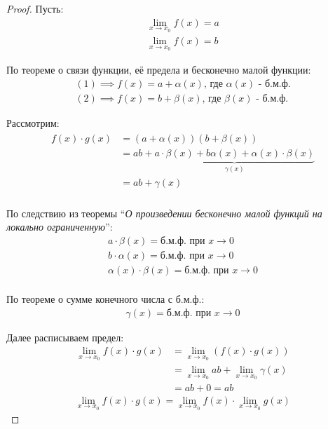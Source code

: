 \begin{proof}
    Пусть:
    \begin{gather*}
        \lim_{x \to x_0} f(x) = a \tag{1} \\
        \lim_{x \to x_0} f(x) = b \tag{2}
    \end{gather*}

    По теореме о связи функции, её предела и бесконечно малой функции:
    \begin{gather*}
        (1) \implies f(x) = a + \alpha(x) \text{, где } \alpha(x) \text{ - б.м.ф.} \\
        (2) \implies f(x) = b + \beta(x) \text{, где } \beta(x) \text{ - б.м.ф.}
    \end{gather*}

    Рассмотрим:
    \begin{gather*}
        \begin{align*}
        f(x) \cdot g(x) &= (a + \alpha(x))(b + \beta(x)) \\
                        &= ab + \underbrace{a \cdot \beta(x) + b \alpha (x) + \alpha(x) \cdot \beta(x)}_{\gamma(x)} \\
                        &= ab + \gamma(x) \\
        \end{align*}
    \end{gather*}

    По следствию из теоремы ``\textit{О произведении бесконечно малой функций на локально ограниченную}'':
    \begin{gather*}
        a \cdot \beta(x) = \text{б.м.ф. при } x \to 0 \\ 
        b \cdot \alpha(x) = \text{б.м.ф. при } x \to 0 \\ 
        \alpha(x) \cdot \beta(x) = \text{б.м.ф. при } x \to 0 \\ 
    \end{gather*}

    По теореме о сумме конечного числа с б.м.ф.:
    \begin{gather*}
        \gamma(x) = \text{б.м.ф. при } x \to 0
    \end{gather*}

    Далее расписываем предел:
    \begin{align*}
        \lim_{x \to x_0} f(x) \cdot g(x) &= \lim_{x \to x_0} (f(x) \cdot g(x)) \\
            &= \lim_{x \to x_0} ab + \lim_{x \to x_0} \gamma(x) \\
            &= ab + 0 = ab
    \end{align*}
    \begin{gather*}
        \lim_{x \to x_0} f(x) \cdot g(x) = \lim_{x \to x_0} f(x) \cdot \lim_{x \to x_0} g(x)
    \end{gather*}
\end{proof}
\pagebreak



